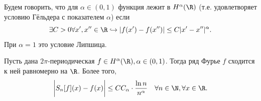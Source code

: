 \begin{definition}
    Будем говорить, что для $\alpha \in (0, 1)$ функция лежит в $H^\alpha(\R)$ (т.е. удовлетворяет условию Гёльдера с показателем $\alpha$) если \[
                                                                                                                                                     \exists C > 0 \forall x', x'' \in \R \hookrightarrow |f(x') - f(x'')| \leq C|x' - x''|^\alpha.
    \]
    При $\alpha = 1$ это условие Липшица.
\end{definition}
\begin{theorem}
    Пусть дана $2\pi$-периодическая $f \in H^\alpha(\R), \alpha \in (0, 1)$. Тогда ряд Фурье $f$ сходится к ней равномерно на $\R$. Более того, \[
                                                                                                                                                    \biggr|S_n[f](x) - f(x)\biggr| \leq C C_\alpha \cdot \dfrac{\ln n}{n^\alpha} \quad \forall n \in \N, \forall x \in \R.
    \]
\end{theorem}
